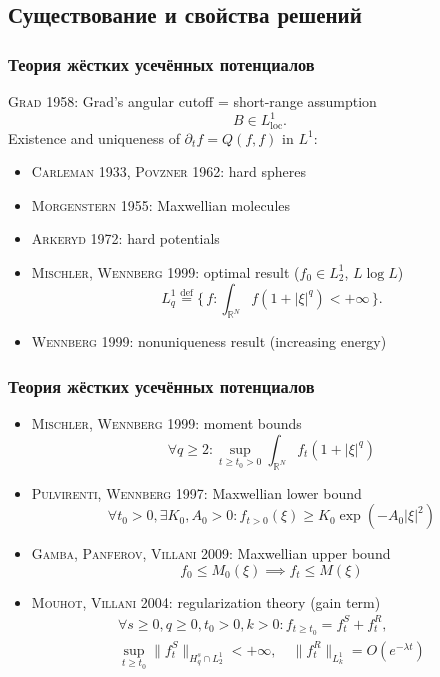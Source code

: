 \documentclass[mathserif]{beamer} %
\newcommand{\loc}{\mathrm{loc}}
\newcommand{\eqdef}{\overset{\mathrm{def}}{=}}
\newcommand{\pder}[2][]{\partial_{#2}{#1}}
\newcommand{\OO}[1]{O(#1)}
\newcommand{\Set}[2]{\{\,{#1}:{#2}\,\}}
\newcommand{\Cite}[2][]{\alert{\textsc{#2 #1}}}
\begin{document}
\subsection{Существование и свойства решений}

\begin{frame}
    \frametitle{Теория жёстких усечённых потенциалов}
    \Cite[1958]{Grad}: Grad's angular cutoff = short-range assumption
    \[ B\in L^1_\loc. \]
    Existence and uniqueness of \(\pder[f]{t} = Q(f,f)\) in \(L^1\):
    \begin{itemize}
        \item \Cite[1933]{Carleman}, \Cite[1962]{Povzner}: hard spheres
        \item \Cite[1955]{Morgenstern}: Maxwellian molecules
        \item \Cite[1972]{Arkeryd}: hard potentials
        \item \Cite[1999]{Mischler, Wennberg}: optimal result (\(f_0\in L^1_2\), \sout{\(L\log{L}\)})\!\!\!\!\!\!\!\!\!\!
        \[ L^1_q \eqdef \Set{f}{\int_{\mathbb{R}^N} f(1+|\xi|^q) < +\infty}. \]
        \item \Cite[1999]{Wennberg}: nonuniqueness result (increasing energy)
    \end{itemize}
\end{frame}

\begin{frame}
    \frametitle{Теория жёстких усечённых потенциалов}
    \begin{itemize}
        \item \Cite[1999]{Mischler, Wennberg}: moment bounds
        \[ \forall q\geq2: \sup_{t\geq t_0>0} \int_{\mathbb{R}^N} f_t (1+|\xi|^q) \]
        \item \Cite[1997]{Pulvirenti, Wennberg}: Maxwellian lower bound
        \[ \forall t_0>0, \exists K_0,A_0>0: f_{t>0}(\xi) \geq K_0\exp\left( -A_0 |\xi|^2\right) \]
        \item \Cite[2009]{Gamba, Panferov, Villani}: Maxwellian upper bound \!\!\!\!\!
        \[ f_0 \leq M_0(\xi) \implies f_t \leq M(\xi)\]
        \item \Cite[2004]{Mouhot, Villani}: regularization theory (gain term)
        \begin{gather*}
            \forall s\geq0,q\geq0,t_0>0,k>0 : f_{t\geq t_0} = f^S_t + f^R_t, \\
            \sup_{t\geq t_0} \|f^S_t\|_{H^s_q\cap L_2^1} < +\infty,
            \quad \|f^R_t\|_{L_k^1} = \OO{e^{-\lambda t}}
        \end{gather*}
    \end{itemize}
\end{frame}
\end{document}

